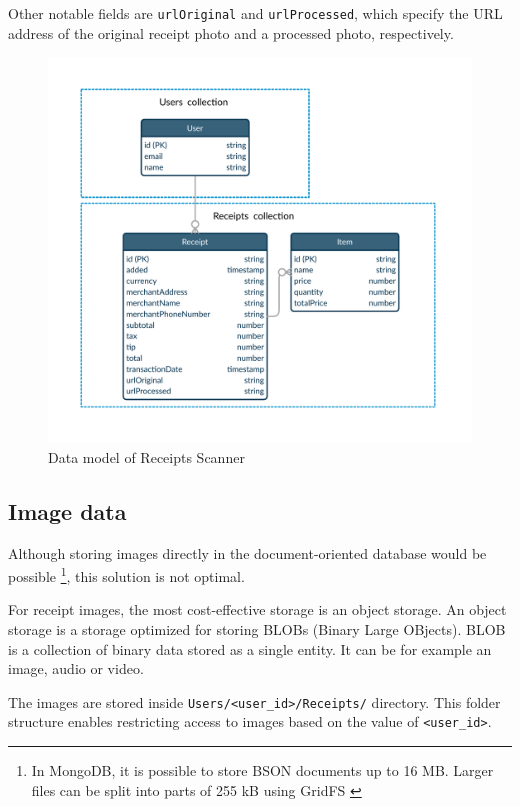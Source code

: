 \documentclass[
  digital, %
  table,   %
  oneside, %
  lof,     %
  lot,     %
]{fithesis3}
\begin{document}
Other notable fields are \texttt{urlOriginal} and \texttt{urlProcessed}, which specify the URL address of the original receipt photo and a processed photo, respectively. 

    \begin{figure}
        \begin{center}
            \includegraphics[width=\textwidth]{figures/other/data_model_firestore}
        \end{center}
        \caption{Data model of Receipts Scanner}
        \label{fig:data_model_firestore}
    \end{figure}

\subsection{Image data}
Although storing images directly in the document-oriented database would be possible \footnote{In MongoDB, it is possible to store BSON documents up to 16 MB. Larger files can be split into parts of 255 kB using GridFS \cite{GridFS}}, this solution is not optimal.

For receipt images, the most cost-effective storage is an object storage. An object storage is a storage optimized for storing BLOBs (Binary Large OBjects). BLOB is a collection of binary data stored as a single entity. It can be for example an image, audio or video. 

The images are stored inside \texttt{Users/<user\_id>/Receipts/} directory. This folder structure enables restricting access to images based on the value of \texttt{<user\_id>}.
\end{document}
